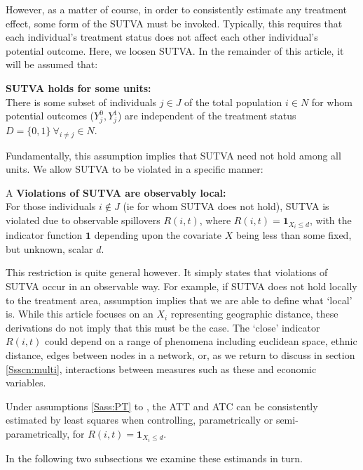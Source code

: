However, as a matter of course, in order to consistently estimate any
treatment effect, some form of the SUTVA must be invoked.  Typically,
this requires that each individual's treatment status does not affect
each other individual's potential outcome.  Here, we loosen SUTVA. 
In the remainder of this article, it will be assumed that:
\begin{assumption}{3}{}
\label{Sass:SUTVAs}
\textbf{SUTVA holds for some units:} \\
There is some subset of individuals $j\in J$ of the total population $i\in N$ 
for whom potential outcomes ($Y_j^0, Y_j^1$) are independent of the treatment 
status $D=\{0,1\}\ \forall_{i\neq j} \in N$.
\end{assumption}
\noindent Fundamentally, this assumption implies that SUTVA need not hold among 
all units.  We allow SUTVA to be violated in a specific manner:
\begin{assumption}{4}{A}
\label{Sass:SUTVAl}
\textbf{Violations of SUTVA are observably local:} \\ 
For those individuals $i\notin J$ (ie for whom SUTVA does not hold), SUTVA is
violated due to observable spillovers $R(i,t)$, where 
$R(i,t)=\mathbf{1}_{X_i\leq d}$, with the indicator function $\mathbf{1}$
depending upon the covariate $X$ being less than some fixed, but unknown, 
scalar $d$.
\end{assumption}
\vspace{-4mm}
\noindent This restriction is quite general however.  It simply states that
violations of SUTVA occur in an observable way.  For example, if SUTVA does
not hold locally to the treatment area, assumption  implies
that we are able to define what `local' is.  While this article focuses on
an $X_i$ representing geographic distance, these derivations do not imply that 
this must be the case.  The `close' indicator $R(i,t)$ could depend on a range 
of phenomena including euclidean space, ethnic distance, edges between
nodes in a network, or, as we return to discuss in section
\ref{Ssscn:multi}, interactions between measures such as  these and
economic variables. 
\begin{proposition}
\label{Pass:ATT}
Under assumptions \ref{Sass:PT} to , the ATT and ATC can be 
consistently estimated by least squares when controlling, parametrically or
semi-parametrically, for $R(i,t)=\mathbf{1}_{X_i\leq d}$.
\end{proposition}
\noindent In the following two subsections we examine these estimands in turn. 

